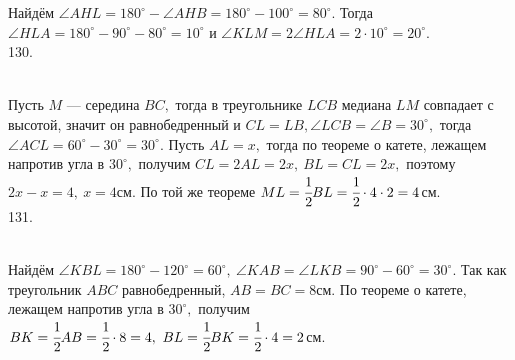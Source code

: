 \documentclass[12pt]{article}
\begin{document}
Найдём $\angle AHL=180^\circ-\angle AHB=180^\circ-100^\circ=80^\circ.$ Тогда $\angle HLA=180^\circ-90^\circ-80^\circ=10^\circ$ и $\angle KLM=2\angle HLA=2\cdot10^\circ=20^\circ.$\\
130. \begin{figure}[ht!]
\end{figure}\\
Пусть $M$ --- середина $BC,$ тогда в треугольнике $LCB$ медиана $LM$ совпадает с высотой, значит он равнобедренный и  $CL=LB, \angle LCB=\angle B=30^\circ,$ тогда $\angle ACL=60^\circ-30^\circ=30^\circ.$ Пусть $AL=x,$ тогда по теореме о катете, лежащем напротив угла в $30^\circ,$ получим $CL=2AL=2x,\ BL=CL=2x,$ поэтому $2x-x=4,\ x=4$см. По той же теореме $ML=\cfrac{1}{2}BL=\cfrac{1}{2}\cdot4\cdot2=4$см.\\
131. \begin{figure}[ht!]
\end{figure}\\
Найдём $\angle KBL=180^\circ-120^\circ=60^\circ,\ \angle KAB=\angle LKB=90^\circ-60^\circ=30^\circ.$ Так как треугольник $ABC$ равнобедренный, $AB=BC=8$см. По теореме о катете, лежащем напротив угла в $30^\circ,$ получим $BK=\cfrac{1}{2}AB=\cfrac{1}{2}\cdot8=4,\ BL=\cfrac{1}{2}BK=\cfrac{1}{2}\cdot4=2$см.\newpage\noindent
\end{document}
